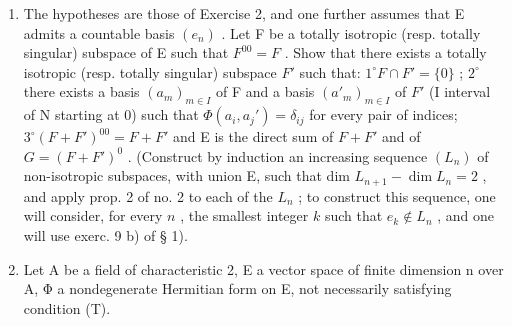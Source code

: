 \begin{enumerate}
\def\labelenumi{\arabic{enumi})}
\setcounter{enumi}{12}
\item
  The hypotheses are those of Exercise 2, and one further assumes that E admits a countable basis \((e_n)\) . Let F be a totally isotropic (resp. totally singular) subspace of E such that \(F^{00} = F\) . Show that there exists a totally isotropic (resp. totally singular) subspace \(F'\) such that: \(1^\circ F \cap F' = \{0\}\) ; \(2^\circ\) there exists a basis \((a_m)_{m \in I}\) of F and a basis \((a'_m)_{m \in I}\) of \(F'\) (I interval of N starting at 0) such that \(\Phi(a_i, a_j') = \delta_{ij}\) for every pair of indices; \(3^\circ (F + F')^{00} = F + F'\) and E is the direct sum of \(F + F'\) and of \(G = (F + F')^0\) . (Construct by induction an increasing sequence \((L_n)\) of non-isotropic subspaces, with union E, such that dim \(L_{n+1} - \dim L_n = 2\) , and apply prop. 2 of no. 2 to each of the \(L_n\) ; to construct this sequence, one will consider, for every \(n\) , the smallest integer \(k\) such that \(e_k \notin L_n\) , and one will use exerc. 9 b) of § 1).
\item
  Let A be a field of characteristic 2, E a vector space of finite dimension n over A, Φ a nondegenerate Hermitian form on E, not necessarily satisfying condition (T).
\end{enumerate}

